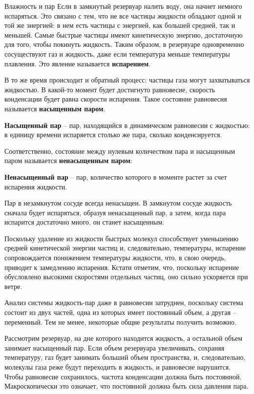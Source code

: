 \documentclass{article}
\newcommand{\definition}[2]{\begin{samepage} \textbf{#1} -- #2. \end{samepage} \par}
\begin{document}
	\begin{section}{Влажность и пар}
		Если в замкнутый резервуар налить воду, она начнет немного испаряться. Это связано с тем, что не все частицы жидкости обладают одной и той же энергией: в нем есть частицы с энергией, как большей средней, так и меньшей. Самые быстрые частицы имеют кинетическую энергию, достаточную для того, чтобы покинуть жидкость. Таким образом, в резервуаре одновременно сосуществуют газ и жидкость, даже если температура меньше температуры плавления. Это явление называется \textbf{испарением}.

		В то же время происходит и обратный процесс: частицы газа могут захватываться жидкостью. В какой-то момент будет достигнуто равновесие, скорость конденсации будет равна скорости испарения. Такое состояние равновесия называется \textbf{насыщенным паром}.

		\definition{Насыщенный пар}{пар, находящийся в динамическом равновесии с жидкостью: в единицу времени испаряется столько же пара, сколько конденсируется}

		Соответственно, состояние между нулевым количеством пара и насыщенным паром называется \textbf{ненасыщенным паром}:

		\definition{Ненасыщенный пар}{пар, количество которого в моменте растет за счет испарения жидкости}

		Пар в незамкнутом сосуде всегда ненасыщен. В замкнутом сосуде жидкость сначала будет испаряться, образуя ненасыщенный пар, а затем, когда пара испарится достаточно много, он станет насыщенным.

		Поскольку удаление из жидкости быстрых молекул способствует уменьшению средней кинетической энергии частиц и, следовательно, температуры, испарение сопровождается понижением температуры жидкости, что, в свою очередь, приводит к замедлению испарения. Кстати отметим, что, поскольку испарение обусловлено высокими скоростями отдельных частиц, оно сильно ускоряется при ветре.

		Анализ системы жидкость-пар даже в равновесии затруднен, поскольку система состоит из двух частей, одна из которых имеет постоянный объем, а другая -- переменный. Тем не менее, некоторые общие результаты получить возможно.

		Рассмотрим резервуар, на дне которого находится жидкость, а остальной объем занимает насыщенный пар. Если объем резервуара увеличивать, сохраняя температуру, газ будет занимать больший объем пространства, и, следовательно, молекулы газа реже будут переходить в жидкость, и равновесие нарушится. Чтобы равновесие сохранилось, частота конденсации должна быть постоянной. Макроскопически это означает, что постоянной должна быть сила давления пара.


\end{section}
\end{document}
